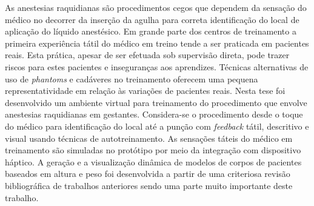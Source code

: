 \begin{resumo}


As anestesias raquidianas são procedimentos cegos que dependem da sensação do médico no decorrer da inserção da agulha para correta identificação do local de aplicação do líquido anestésico. Em grande parte dos centros de treinamento a primeira experiência tátil do médico em treino tende a ser praticada em pacientes reais. Esta prática, apesar de ser efetuada sob supervisão direta, pode trazer riscos para estes pacientes e inseguranças aos aprendizes. Técnicas alternativas de uso de \textit{phantoms} e cadáveres no treinamento oferecem uma pequena representatividade em relação às variações de pacientes reais. 
Nesta tese foi desenvolvido um ambiente virtual para treinamento do procedimento que envolve anestesias raquidianas em gestantes. Considera-se o procedimento desde o toque do médico para identificação do local até a punção com \textit{feedback} tátil, descritivo e visual usando técnicas de autotreinamento. As sensações táteis do médico em treinamento são simuladas no protótipo por meio da integração com dispositivo háptico. A geração e a visualização dinâmica de modelos de corpos de pacientes baseados em altura e peso foi desenvolvida a partir de uma criteriosa revisão bibliográfica de trabalhos anteriores sendo uma parte muito importante deste trabalho. 

\end{resumo}

